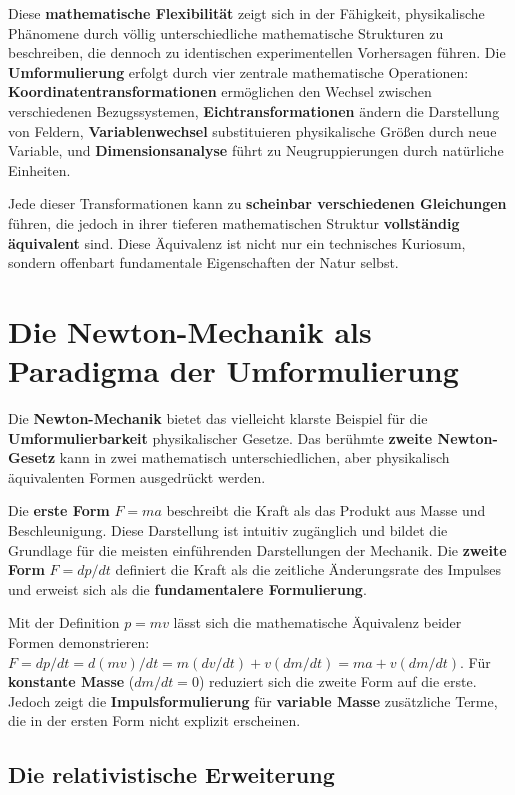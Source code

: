 \documentclass[12pt,a4paper]{report}
\begin{document}
	Diese \textbf{mathematische Flexibilität} zeigt sich in der Fähigkeit, physikalische Phänomene durch völlig unterschiedliche mathematische Strukturen zu beschreiben, die dennoch zu identischen experimentellen Vorhersagen führen. Die \textbf{Umformulierung} erfolgt durch vier zentrale mathematische Operationen: \textbf{Koordinatentransformationen} ermöglichen den Wechsel zwischen verschiedenen Bezugssystemen, \textbf{Eichtransformationen} ändern die Darstellung von Feldern, \textbf{Variablenwechsel} substituieren physikalische Größen durch neue Variable, und \textbf{Dimensionsanalyse} führt zu Neugruppierungen durch natürliche Einheiten.
	
	Jede dieser Transformationen kann zu \textbf{scheinbar verschiedenen Gleichungen} führen, die jedoch in ihrer tieferen mathematischen Struktur \textbf{vollständig äquivalent} sind. Diese Äquivalenz ist nicht nur ein technisches Kuriosum, sondern offenbart fundamentale Eigenschaften der Natur selbst.
	
	\section{Die Newton-Mechanik als Paradigma der Umformulierung}
	
	Die \textbf{Newton-Mechanik} bietet das vielleicht klarste Beispiel für die \textbf{Umformulierbarkeit} physikalischer Gesetze. Das berühmte \textbf{zweite Newton-Gesetz} kann in zwei mathematisch unterschiedlichen, aber physikalisch äquivalenten Formen ausgedrückt werden.
	
	Die \textbf{erste Form} $F = ma$ beschreibt die Kraft als das Produkt aus Masse und Beschleunigung. Diese Darstellung ist intuitiv zugänglich und bildet die Grundlage für die meisten einführenden Darstellungen der Mechanik. Die \textbf{zweite Form} $F = dp/dt$ definiert die Kraft als die zeitliche Änderungsrate des Impulses und erweist sich als die \textbf{fundamentalere Formulierung}.
	
	Mit der Definition $p = mv$ lässt sich die mathematische Äquivalenz beider Formen demonstrieren: $F = dp/dt = d(mv)/dt = m(dv/dt) + v(dm/dt) = ma + v(dm/dt)$. Für \textbf{konstante Masse} ($dm/dt = 0$) reduziert sich die zweite Form auf die erste. Jedoch zeigt die \textbf{Impulsformulierung} für \textbf{variable Masse} zusätzliche Terme, die in der ersten Form nicht explizit erscheinen.
	
	\subsection{Die relativistische Erweiterung}
	
\end{document}

